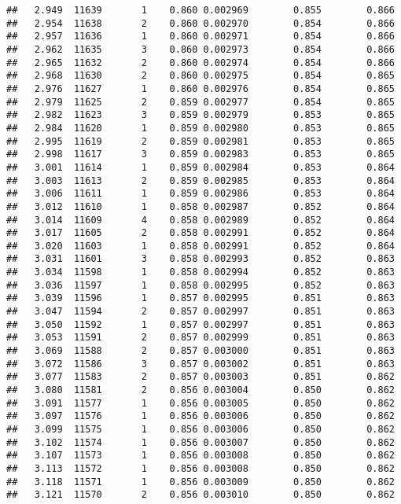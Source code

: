 \documentclass[
]{book}
\begin{document}
\begin{verbatim}
##   2.949  11639       1    0.860 0.002969        0.855        0.866
##   2.954  11638       2    0.860 0.002970        0.854        0.866
##   2.957  11636       1    0.860 0.002971        0.854        0.866
##   2.962  11635       3    0.860 0.002973        0.854        0.866
##   2.965  11632       2    0.860 0.002974        0.854        0.866
##   2.968  11630       2    0.860 0.002975        0.854        0.865
##   2.976  11627       1    0.860 0.002976        0.854        0.865
##   2.979  11625       2    0.859 0.002977        0.854        0.865
##   2.982  11623       3    0.859 0.002979        0.853        0.865
##   2.984  11620       1    0.859 0.002980        0.853        0.865
##   2.995  11619       2    0.859 0.002981        0.853        0.865
##   2.998  11617       3    0.859 0.002983        0.853        0.865
##   3.001  11614       1    0.859 0.002984        0.853        0.864
##   3.003  11613       2    0.859 0.002985        0.853        0.864
##   3.006  11611       1    0.859 0.002986        0.853        0.864
##   3.012  11610       1    0.858 0.002987        0.852        0.864
##   3.014  11609       4    0.858 0.002989        0.852        0.864
##   3.017  11605       2    0.858 0.002991        0.852        0.864
##   3.020  11603       1    0.858 0.002991        0.852        0.864
##   3.031  11601       3    0.858 0.002993        0.852        0.863
##   3.034  11598       1    0.858 0.002994        0.852        0.863
##   3.036  11597       1    0.858 0.002995        0.852        0.863
##   3.039  11596       1    0.857 0.002995        0.851        0.863
##   3.047  11594       2    0.857 0.002997        0.851        0.863
##   3.050  11592       1    0.857 0.002997        0.851        0.863
##   3.053  11591       2    0.857 0.002999        0.851        0.863
##   3.069  11588       2    0.857 0.003000        0.851        0.863
##   3.072  11586       3    0.857 0.003002        0.851        0.863
##   3.077  11583       2    0.857 0.003003        0.851        0.862
##   3.080  11581       2    0.856 0.003004        0.850        0.862
##   3.091  11577       1    0.856 0.003005        0.850        0.862
##   3.097  11576       1    0.856 0.003006        0.850        0.862
##   3.099  11575       1    0.856 0.003006        0.850        0.862
##   3.102  11574       1    0.856 0.003007        0.850        0.862
##   3.107  11573       1    0.856 0.003008        0.850        0.862
##   3.113  11572       1    0.856 0.003008        0.850        0.862
##   3.118  11571       1    0.856 0.003009        0.850        0.862
##   3.121  11570       2    0.856 0.003010        0.850        0.862

\end{verbatim}
\end{document}
